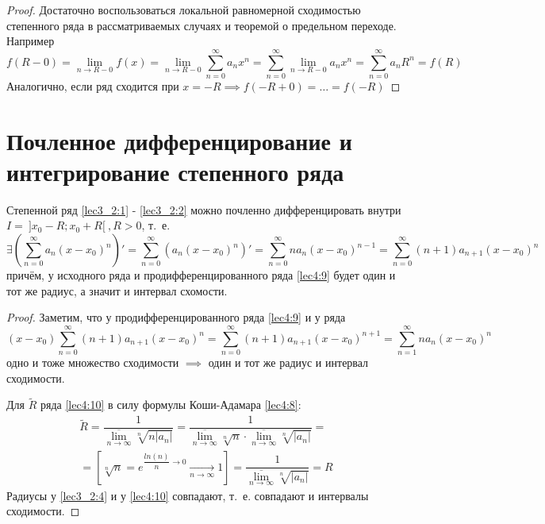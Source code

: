 \documentclass[../../main.tex]{subfiles}
\begin{document}
\begin{proof}
	Достаточно воспользоваться локальной равномерной сходимостью
	степенного ряда в рассматриваемых случаях и 
	теоремой о предельном переходе. Например
	\[ f(R - 0) = \underset{n \to R - 0}{\lim} f(x) = 
	\underset{n \to R - 0}{\lim} \sum\limits_{n = 0}^{\infty} a_n x^n =
	\sum\limits_{n = 0}^{\infty} \underset{n \to R - 0}{\lim} a_n x^n = 
	\sum\limits_{n = 0}^{\infty} a_n R^n = f(R)
	\]
	Аналогично, если ряд сходится при $x = -R \implies f(-R + 0) = 
	\ldots = f(-R)$
\end{proof}

\section{Почленное дифференцирование и интегрирование степенного ряда}

\begin{thm}
	Степенной ряд \eqref{lec3_2:1} - \eqref{lec3_2:2} можно почленно 
	дифференцировать внутри $I = \: ]x_0 - R; x_0 + R[ \:, R > 0$, т.~е.
	\begin{equation} \label{lec4:9}
		\exists \left( \sum\limits_{n = 0}^{\infty} a_n(x - x_0)^n \right)' = 
		\sum\limits_{n = 0}^{\infty} \left( a_n(x - x_0)^n \right)' = 
		\sum\limits_{n = 0}^{\infty} n a_n(x - x_0)^{n - 1} = 
		\sum\limits_{n = 0}^{\infty} (n + 1)a_{n + 1} (x - x_0)^n
	\end{equation} 
	причём, у исходного ряда и продифференцированного ряда 
	\eqref{lec4:9} будет один и тот же радиус, а значит и интервал схомости.
\end{thm}

\begin{proof}
	Заметим, что у продифференцированного ряда \eqref{lec4:9} и у ряда \\
	\begin{equation} \label{lec4:10}
		(x - x_0) \sum\limits_{n = 0}^{\infty} (n + 1)a_{n + 1}(x - x_0)^n = 
		\sum\limits_{n = 0}^{\infty} (n + 1) a_{n + 1} (x - x_0)^{n + 1} = 
		\sum\limits_{n = 1}^{\infty} n a_n (x - x_0)^n
	\end{equation}
	одно и тоже множество сходимости $\implies $ один и тот же 
	радиус и интервал сходимости.
	
	Для $\widetilde{R}$ ряда \eqref{lec4:10} в силу 
	формулы Коши-Адамара \eqref{lec4:8}: 
	\[ \begin{gathered}
	\widetilde{R} = \dfrac{1}{  \underset{n \to \infty}{\overline{\lim}}
	\sqrt[n]{n|a_n|}  } = 
	\dfrac{1}{  \underset{n \to \infty}{\overline{\lim}} \sqrt[n]{n}
	\cdot \underset{n \to \infty}{\overline{\lim}} \sqrt[n]{|a_n|}  } = \\
	= \left[ \sqrt[n]{n} = e^{ \dfrac{ln(n)}{n} \rightarrow 0 } 
	\underset{n \to \infty}{\longrightarrow} 1 \right] = 
	\dfrac{1}{  \underset{n \to \infty}{\overline{\lim}} \sqrt[n]{|a_n|} } = R
	\end{gathered} \]
	Радиусы у \eqref{lec3_2:4} и у \eqref{lec4:10} совпадают, т.~е.
	совпадают и интервалы сходимости.
\end{proof}
\end{document}
